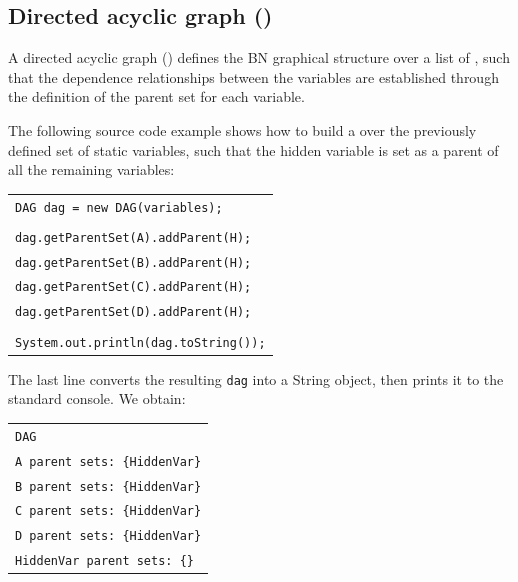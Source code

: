 \subsection{Directed acyclic graph ()}

A directed acyclic graph () defines the BN graphical structure over a list of , such that the dependence relationships between the variables are established through the definition of the parent set for each variable. 

The following source code example shows how to build a  over the previously defined set of static variables, such that the hidden variable is set as a parent of all the remaining variables:

\vspace{-0.1in}
\begin{table}[H]
\begin{tabular}{l} \\ \hline

        \texttt{DAG dag = new DAG(variables);}\\\\

        \texttt{dag.getParentSet(A).addParent(H);}\\
        \texttt{dag.getParentSet(B).addParent(H);}\\
        \texttt{dag.getParentSet(C).addParent(H);}\\
        \texttt{dag.getParentSet(D).addParent(H);}\\\\
        
        \texttt{System.out.println(dag.toString());}\\\hline 

\end{tabular}
\end{table}

The last line converts the resulting \texttt{dag} into a String object, then prints it to the standard console. We obtain:

\vspace{-0.1in}
\begin{table}[H]
\small{\begin{tabular}{l} \\
\texttt{DAG}\\
\texttt{A parent sets: \{HiddenVar\}}\\
\texttt{B parent sets: \{HiddenVar\}}\\
\texttt{C parent sets: \{HiddenVar\}}\\
\texttt{D parent sets: \{HiddenVar\}}\\
\texttt{HiddenVar parent sets: \{\}}\\
\end{tabular}}
\end{table}


